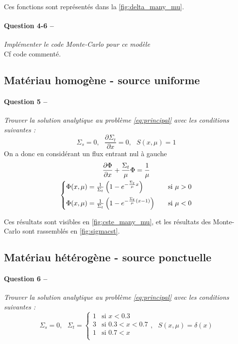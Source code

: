 \documentclass[11pt,a4paper]{article}
\newcommand{\dx}[1]{\dfrac{\partial #1}{\partial x}}
\newcommand{\question}[2]{\paragraph{Question #1 --}\hspace{-7pt}\textit{#2} \\}
\begin{document}
Ces fonctions sont représentés dans la \autoref{fig:delta_many_mu}.



\question{4-6}{Implémenter le code Monte-Carlo pour ce modèle}

Cf code commenté.



\subsection{Matériau homogène - source uniforme}

\question{5}{Trouver la solution analytique au problème \autoref{eq:principal} avec les conditions suivantes :}

\begin{equation}
  \Sigma_s=0, ~~~ \dx{\Sigma_t} = 0, ~~~ S(x, \mu) = 1
\end{equation}
On a donc en considérant un flux entrant nul à gauche 
\begin{gather}
  \dx{\Phi} + \frac{\Sigma_t}{\mu} \Phi = \frac{1}{\mu} \\
  \begin{cases}
    \Phi(x, \mu)= \frac{1}{\Sigma_t}\left( 1-e^{-\frac{\Sigma_t}{\mu}x}\right) &~~~ \mbox{si } \mu>0 \medskip \\ %
    \Phi(x, \mu)= \frac{1}{\Sigma_t}\left( 1-e^{-\frac{\Sigma_t}{\mu}(x-1)}\right) &~~~ \mbox{si } \mu<0 
  \end{cases}
\end{gather}

Ces résultats sont visibles en \autoref{fig:cste_many_mu}, et les résultats des Monte-Carlo sont rassemblés en \autoref{fig:sigmacst}.


\subsection{Matériau hétérogène - source ponctuelle}

\question{6}{Trouver la solution analytique au problème \autoref{eq:principal} avec les conditions suivantes :}

\begin{equation}
  \Sigma_s=0, ~~~
  \Sigma_t =
  \begin{cases}
    1 &\mbox{si } x<0.3 \\
    3 &\mbox{si } 0.3<x<0.7 \\
    1 &\mbox{si } 0.7<x \\
  \end{cases}
  , ~~~ S(x, \mu) = \delta(x)
\end{equation}
\end{document}
